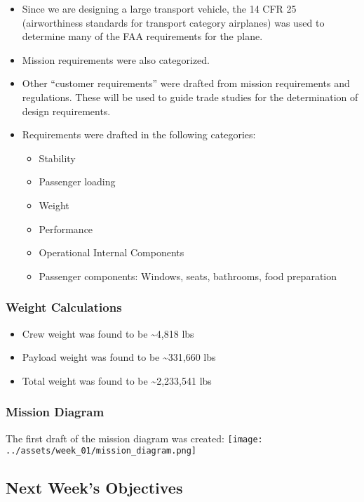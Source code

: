 \documentclass[12pt]{article}
\begin{document}
\begin{itemize}
\tightlist
\item
  Since we are designing a large transport vehicle, the 14 CFR 25
  (airworthiness standards for transport category airplanes) was used to
  determine many of the FAA requirements for the plane.
\item
  Mission requirements were also categorized.
\item
  Other ``customer requirements'' were drafted from mission requirements
  and regulations. These will be used to guide trade studies for the
  determination of design requirements.
\item
  Requirements were drafted in the following categories:

  \begin{itemize}
  \tightlist
  \item
    Stability
  \item
    Passenger loading
  \item
    Weight
  \item
    Performance
  \item
    Operational Internal Components
  \item
    Passenger components: Windows, seats, bathrooms, food preparation
  \end{itemize}
\end{itemize}

\subsubsection{Weight Calculations}\label{weight-calculations}

\begin{itemize}
\tightlist
\item
  Crew weight was found to be \textasciitilde4,818 lbs
\item
  Payload weight was found to be \textasciitilde331,660 lbs
\item
  Total weight was found to be \textasciitilde2,233,541 lbs
\end{itemize}

\subsubsection{Mission Diagram}\label{mission-diagram}

The first draft of the mission diagram was created:
\texttt{[image: ../assets/week\_01/mission\_diagram.png]}

\subsection{Next Week's Objectives}\label{next-weeks-objectives}
\end{document}
